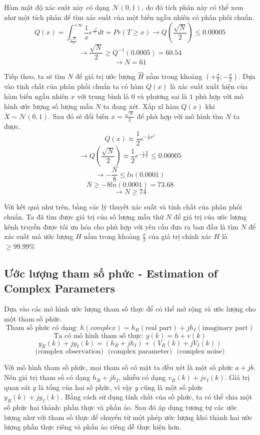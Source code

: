 \documentclass{article}
\begin{document}
Hàm mật độ xác suất này có dạng $\mathcal{N} (0,1)$, do đó tích phân này có thể xem như một tích phân để tìm xác suất của một biến ngẫu nhiên có phân phối chuẩn.
$$Q(x) = \int_{\frac{\sqrt{N}}{2}}^{+\infty}\frac{1}{x} e^\frac{-t}{2} dt = Pr(T \geq x) \rightarrow Q(\frac{\sqrt{N}}{2}) \leq 0.00005$$
$$\rightarrow \frac{\sqrt{N}}{2} \geq Q^{-1} (0.0005) = 60.54$$
$$  \rightarrow N =61$$

Tiếp theo, ta sẽ tìm $N$ để giá trị ước lượng $\hat{H}$ nằm trong khoảng $(+\frac{\sigma}{2};-\frac{\sigma}{2})$. Dựa vào tính chất của phân phối chuẩn ta có hàm $Q(x)$ là xác suất xuất hiện của hàm biến ngẫu nhiên $x$ với trung bình là $0$ và phương sai là $1$ phù hợp với mô hình ước lượng số lượng mẫu $N$ ta đang xét. Xấp xĩ hàm $Q(x)$ khi $X \sim \mathcal{N}(0,1)$. Sau đó sẽ đổi biến $x=\frac{\sqrt{N}}{2}$ để phù hợp với mô hình tìm $N$ ta được.
$$Q(x) \approx \frac{1}{2} e^{-\frac{1}{2} x^2}$$
$$\rightarrow Q(\frac{\sqrt{N}}{2}) \approx \frac{1}{2}e^{-\frac{1}{2}\frac{N}{4}} \leq 0.00005$$
$$\rightarrow -\frac{N}{8} \leq ln(0.0001)$$
$$N \geq -8ln(0.0001) = 73.68$$
$$\rightarrow N \geq 74$$

Với kết quả như trên, bằng các lý thuyết xác suất và tính chất của phân phối chuẩn. Ta đã tìm được giá trị của số lượng mẫu thử $N$ để giá trị của ước lượng kênh truyền được tối ưu hóa cho phù hợp với yêu cầu đưa ra ban đầu là tìm $N$ để xác suất mà ước lượng $\hat{H}$ nằm trong khoảng $\frac{\sigma}{2}$ của giá trị chính xác $H$ là $\geq 99.99\%$
\subsection{Ước lượng tham số phức - Estimation of Complex Parameters}

Dựa vào các mô hình ước lượng tham số thực để có thể mở rộng và ước lượng cho một tham số phức. 
$$\text{Tham số phức có dạng: }h (complex) = h_R (\text{real part}) + jh_I (\text{imaginary part})$$
$$\text{Ta có mô hình tham số thực: } y(k) = h + v(k)$$
$$y_R(k) + jy_I(k) = (h_R + jh_I) + (V_R(k) + j V_I(k))$$
$$\text{(complex observation)  }  \text{ (complex parameter) }  \text{ (complex noise})$$

Với mô hình tham số phức, mọi tham số có mặt ta đều xét là một số phức $a+jb$. Nên giá trị tham số có dạng $h_R + jh_I$, nhiễu có dạng $v_R(k) + j v_I(k)$. Giá trị quan sát $y$ là tổng của hai số phức, vì vậy $y$ cũng là một số phức $y_R(k) + jy_I(k)$. Bằng cách sử dụng tính chất của số phức, ta có thể chia một số phức hai thành: phần thực và phần ảo. Sau đó áp dụng tương tự các ước lượng như với tham số thực để chuyển từ một phép ước lượng khó thành hai ước lượng phần thực riêng và phần ảo riêng dễ thực hiện hơn. \\
\end{document}
